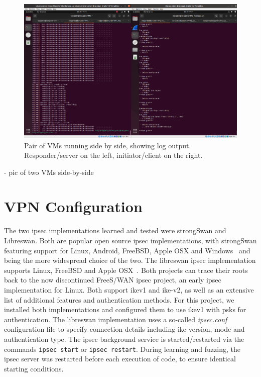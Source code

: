 \begin{figure}
	\centering
	\includegraphics[width=\linewidth]{images/VM_setup}
	\caption{Pair of VMs running side by side, showing log output. \\Responder/server on the left, initiator/client on the right.}
	\label{fig:vmsetup}
\end{figure}


- pic of two VMs side-by-side

\section{VPN Configuration} \label{sec:vpn_setup}
The two \ac{ipsec} implementations learned and tested were strongSwan and Libreswan. Both are popular open source \ac{ipsec} implementations, with strongSwan featuring support for Linux, Android, FreeBSD, Apple OSX and Windows~\cite{doc:strongswan} and being the more widespread choice of the two. The libreswan \ac{ipsec} implementation supports Linux, FreeBSD and Apple OSX~\cite{doc:libreswan}. Both projects can trace their roots back to the now discontinued FreeS/WAN \ac{ipsec} project, an early \ac{ipsec} implementation for Linux. Both support \ac{ike}v1 and \ac{ike}-v2, as well as an extensive list of additional features and authentication methods. For this project, we installed both implementations and configured them to use \ac{ike}v1 with \acp{psk} for authentication. The libreswan implementation uses a so-called \emph{ipsec.conf} configuration file to specify connection details including \ac{ike} version, mode and authentication type. The \ac{ipsec} background service is started/restarted via the commands \texttt{ipsec start} or \texttt{ipsec restart}. During learning and fuzzing, the \ac{ipsec} server was restarted before each execution of code, to ensure identical starting conditions.

